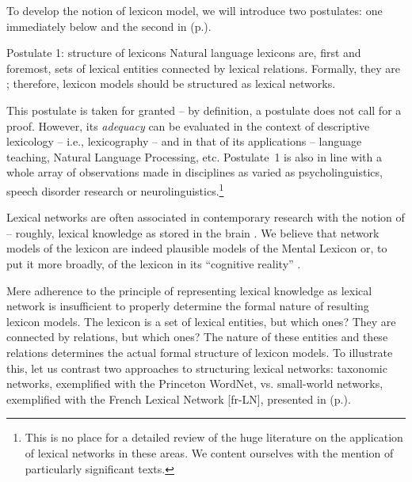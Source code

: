 To develop the notion of lexicon model, we will introduce two postulates: one immediately below and the second in  (p.\thinspace\pageref{txt:postulateStrucLS}).

\label{txt:postulateStrucLexicons}\begin{soundbox}{Postulate 1: structure of lexicons}
Natural language lexicons are, first and foremost, sets of lexical entities connected by lexical relations. Formally, they are ; therefore, lexicon models should be structured as lexical networks.
\end{soundbox}

This postulate is taken for granted  -- by definition, a postulate does not call for a proof. However, its \emph{adequacy} can be evaluated in the context of descriptive lexicology -- i.e., lexicography -- and in that of its applications -- language teaching, Natural Language Processing, etc. Postulate~1 is also in line with a whole array of observations made in disciplines as varied as psycholinguistics, speech disorder research or neurolinguistics.\footnote{This is no place for a detailed review of the huge literature on the application of lexical networks in these areas. We content ourselves with the mention of particularly significant texts.}

Lexical networks are often associated in contemporary research with the notion of  -- roughly, lexical knowledge as stored in the brain \parencite{Aitchison2012,DeDeyneEtAl2017}.
We believe that network models of the lexicon are indeed plausible models of the Mental Lexicon or, to put it more broadly, of the lexicon in its ``cognitive reality'' \parencite[Sec.~6]{GoddardForthcoming}.

\largerpage[2]
Mere adherence to the principle of representing lexical knowledge as lexical network is insufficient to properly determine the formal nature of resulting lexicon models. The lexicon is a set of lexical entities, but which ones? They are connected by relations, but which ones? The nature of these entities and these relations determines the actual formal structure of lexicon models. To illustrate this, let us contrast two approaches to structuring lexical networks: taxonomic networks, exemplified with the Princeton WordNet, vs. small-world networks, exemplified with the French Lexical Network [fr-LN], presented in  (p.\thinspace\pageref{sec:fr-LN}).

